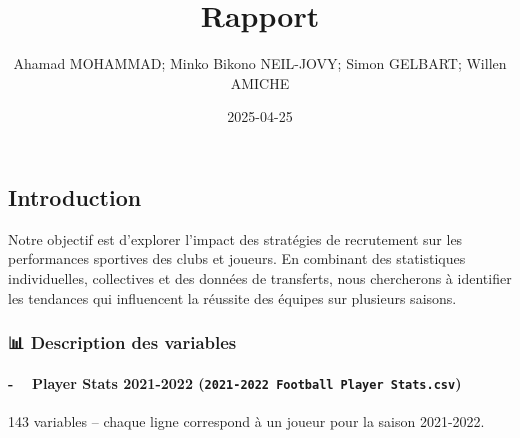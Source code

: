 \documentclass[
]{article}
\title{Rapport}
\author{Ahamad MOHAMMAD; Minko Bikono NEIL-JOVY; Simon GELBART; Willen
AMICHE}
\date{2025-04-25}
\begin{document}
\maketitle

\subsection{\texorpdfstring{\textbf{Introduction}}{Introduction}}\label{introduction}

Notre objectif est d'explorer l'impact des stratégies de recrutement sur
les performances sportives des clubs et joueurs. En combinant des
statistiques individuelles, collectives et des données de transferts,
nous chercherons à identifier les tendances qui influencent la réussite
des équipes sur plusieurs saisons.

\subsubsection{\texorpdfstring{\textbf{📊 Description des
variables}}{📊 Description des variables}}\label{description-des-variables}

\paragraph{\texorpdfstring{- 🧍‍♂️ Player Stats 2021-2022
(\texttt{2021-2022\ Football\ Player\ Stats.csv})}{- 🧍‍♂️ Player Stats 2021-2022 (2021-2022 Football Player Stats.csv)}}\label{player-stats-2021-2022-2021-2022-football-player-stats.csv}

143 variables -- chaque ligne correspond à un joueur pour la saison
2021-2022.
\end{document}
